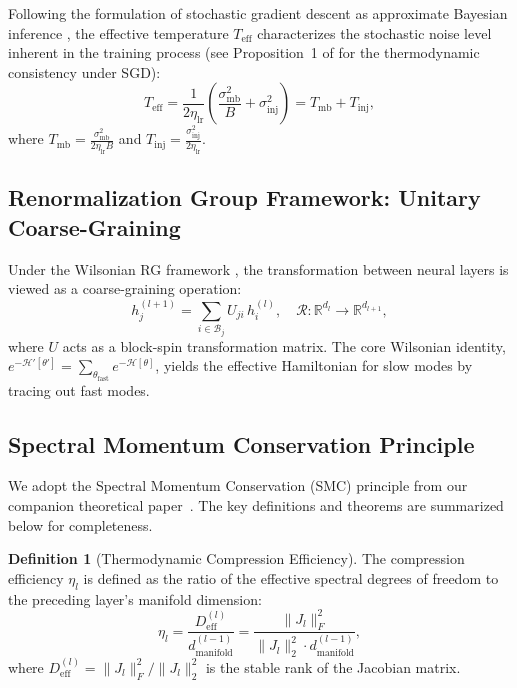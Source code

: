 \documentclass[11pt, a4paper]{article}
\theoremstyle{definition}
\newtheorem{definition}{Definition}[section]
\begin{document}
Following the formulation of stochastic gradient descent as approximate Bayesian inference \cite{mandt2017stochastic, smith2017don}, the effective temperature $T_{\text{eff}}$ characterizes the stochastic noise level inherent in the training process (see Proposition~1 of \cite{liu2024unified} for the thermodynamic consistency under SGD):
\begin{equation}
    T_{\text{eff}} = \frac{1}{2\eta_{\text{lr}}}\left(\frac{\sigma_{\text{mb}}^2}{B} + \sigma_{\text{inj}}^2\right) = T_{\text{mb}} + T_{\text{inj}},
\end{equation}
where $T_{\text{mb}} = \frac{\sigma_{\text{mb}}^2}{2\eta_{\text{lr}}B}$ and $T_{\text{inj}} = \frac{\sigma_{\text{inj}}^2}{2\eta_{\text{lr}}}$.

\subsection{Renormalization Group Framework: Unitary Coarse-Graining}
\label{subsec:rg}

Under the Wilsonian RG framework \cite{wilson1975renormalization}, the transformation between neural layers is viewed as a coarse-graining operation:
\begin{equation}
    h^{(l+1)}_j = \sum_{i \in \mathcal{B}_j} U_{ji} \, h^{(l)}_i, \quad \mathcal{R}: \mathbb{R}^{d_l} \to \mathbb{R}^{d_{l+1}},
\end{equation}
where $U$ acts as a block-spin transformation matrix. The core Wilsonian identity, $e^{-\mathcal{H}'[\theta']} = \sum_{\theta_{\text{fast}}} e^{-\mathcal{H}[\theta]}$, yields the effective Hamiltonian for slow modes by tracing out fast modes.

\subsection{Spectral Momentum Conservation Principle}

We adopt the Spectral Momentum Conservation (SMC) principle from our companion theoretical paper~\cite{liu2024unified}. The key definitions and theorems are summarized below for completeness.

\begin{definition}[Thermodynamic Compression Efficiency]
\label{def:compression-efficiency}
The compression efficiency $\eta_l$ is defined as the ratio of the effective spectral degrees of freedom to the preceding layer's manifold dimension:
\begin{equation}
    \boxed{\eta_l = \frac{D_{\text{eff}}^{(l)}}{d_{\text{manifold}}^{(l-1)}} = \frac{\|J_l\|_F^2}{\|J_l\|_2^2 \cdot d_{\text{manifold}}^{(l-1)}}},
\end{equation}
where $D_{\text{eff}}^{(l)} = \|J_l\|_F^2 / \|J_l\|_2^2$ is the stable rank of the Jacobian matrix.
\end{definition}
\end{document}
